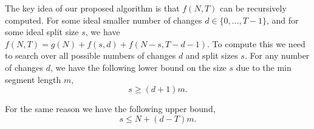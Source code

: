 \documentclass[algorithms,article,accept,oneauthor]{Definitions/mdpi}
\begin{document}
The key idea of our proposed algorithm is that $f(N,T)$ can be recursively computed.
For some ideal smaller number of changes $d\in\{0,\dots,T-1\}$, and for some ideal split size $s$, we have  $f(N,T) = g(N) + f(s,d) + f(N-s,T-d-1)$.
To compute this we need to search over all possible numbers of changes $d$ and split sizes $s$.
For any number of changes $d$, we have the following lower bound on the size $s$ due to the min segment length $m$,
\begin{equation}
\label{eq:s_lower_bound}
    s \geq (d+1)m.
\end{equation}

For the same reason we have the following upper bound,
\begin{equation}
    s \leq N+(d-T)m.
\end{equation}
\end{document}
